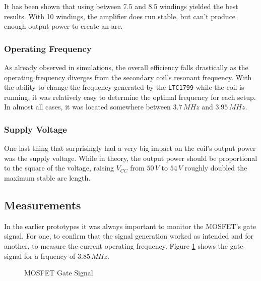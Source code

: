 It has been shown that using between 7.5 and 8.5 windings yielded the best results. With 10 windings, the amplifier does run stable, but can't produce enough output power to create an arc.

\subsubsection{Operating Frequency}

As already observed in simulations, the overall efficiency falls drastically as the operating frequency diverges from the secondary coil's resonant frequency. With the ability to change the frequency generated by the \texttt{LTC1799} while the coil is running, it was relatively easy to determine the optimal frequency for each setup. In almost all cases, it was located somewhere between \(3.7\,MHz\) and \(3.95\,MHz\).

\subsubsection{Supply Voltage}

One last thing that surprisingly had a very big impact on the coil's output power was the supply voltage. While in theory, the output power should be proportional to the square of the voltage, raising \(V_{CC}\) from \(50\,V\) to \(54\,V\) roughly doubled the maximum stable arc length.


\subsection{Measurements}

In the earlier prototypes it was always important to monitor the MOSFET's gate signal. For one, to confirm that the signal generation worked as intended and for another, to measure the current operating frequency. Figure \ref{fig:gate-measured} shows the gate signal for a frquency of \(3.85\,MHz\).

\begin{figure}[h!]
    \centering
    \caption{MOSFET Gate Signal}
    \label{fig:gate-measured}
\end{figure}

